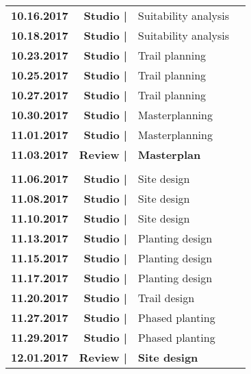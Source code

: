 \documentclass[11pt,article,oneside]{memoir}
\begin{document}
\begin{table}[H]
\begin{tabular}{l r @{\hskip 0.1cm} l @{\hskip 0.5cm} l}
%
\textbf{10.16.2017} & \textbf{Studio |} & Suitability analysis\\
\textbf{10.18.2017} & \textbf{Studio |} & Suitability analysis\\
%
\textbf{10.23.2017} & \textbf{Studio |} & Trail planning\\
\textbf{10.25.2017} & \textbf{Studio |} & Trail planning\\
\textbf{10.27.2017} & \textbf{Studio |} & Trail planning\\
%
\textbf{10.30.2017} & \textbf{Studio |} & Masterplanning\\
\textbf{11.01.2017} & \textbf{Studio |} & Masterplanning\\
\textbf{11.03.2017} & \textbf{Review |} & \textbf{Masterplan}\\
%
\\
%
\textbf{11.06.2017} & \textbf{Studio |} & Site design\\
\textbf{11.08.2017} & \textbf{Studio |} & Site design\\
\textbf{11.10.2017} & \textbf{Studio |} & Site design\\
%
\textbf{11.13.2017} & \textbf{Studio |} & Planting design\\
\textbf{11.15.2017} & \textbf{Studio |} & Planting design\\
\textbf{11.17.2017} & \textbf{Studio |} & Planting design\\
%
\textbf{11.20.2017} & \textbf{Studio |} & Trail design\\ 
%
\textbf{11.27.2017} & \textbf{Studio |} & Phased planting\\
\textbf{11.29.2017} & \textbf{Studio |} & Phased planting\\
\textbf{12.01.2017} & \textbf{Review |} & \textbf{Site design}\\
%
\end{tabular}
\end{table}
\end{document}
